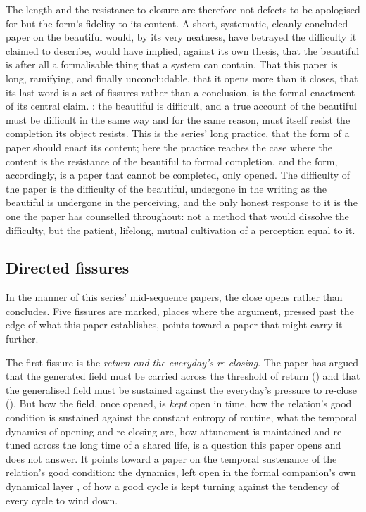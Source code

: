The length and the resistance to closure are therefore not defects to be apologised for but the form's fidelity to its content. A short, systematic, cleanly concluded paper on the beautiful would, by its very neatness, have betrayed the difficulty it claimed to describe, would have implied, against its own thesis, that the beautiful is after all a formalisable thing that a system can contain. That this paper is long, ramifying, and finally unconcludable, that it opens more than it closes, that its last word is a set of fissures rather than a conclusion, is the formal enactment of its central claim. : the beautiful is difficult, and a true account of the beautiful must be difficult in the same way and for the same reason, must itself resist the completion its object resists. This is the series' long practice, that the form of a paper should enact its content; here the practice reaches the case where the content is the resistance of the beautiful to formal completion, and the form, accordingly, is a paper that cannot be completed, only opened. The difficulty of the paper is the difficulty of the beautiful, undergone in the writing as the beautiful is undergone in the perceiving, and the only honest response to it is the one the paper has counselled throughout: not a method that would dissolve the difficulty, but the patient, lifelong, mutual cultivation of a perception equal to it.

\subsection{Directed fissures}
\label{p21:sub:clo-fissures}

In the manner of this series' mid-sequence papers, the close opens rather than concludes. Five fissures are marked, places where the argument, pressed past the edge of what this paper establishes, points toward a paper that might carry it further.

The first fissure is the \emph{return and the everyday's re-closing}. The paper has argued that the generated field must be carried across the threshold of return () and that the generalised field must be sustained against the everyday's pressure to re-close (). But how the field, once opened, is \emph{kept} open in time, how the relation's good condition is sustained against the constant entropy of routine, what the temporal dynamics of opening and re-closing are, how attunement is maintained and re-tuned across the long time of a shared life, is a question this paper opens and does not answer. It points toward a paper on the temporal sustenance of the relation's good condition: the dynamics, left open in the formal companion's own dynamical layer \parencite{wan2026braid}, of how a good cycle is kept turning against the tendency of every cycle to wind down.

